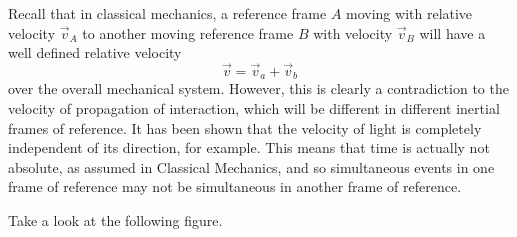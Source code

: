 \documentclass{article}
\begin{document}
			Recall that in classical mechanics, a reference frame $A$ moving with relative velocity $\vec{v}_A$ to another moving reference frame $B$ with velocity $\vec{v}_B$ will have a well defined relative velocity
			$$ \vec{v} = \vec{v}_a + \vec{v}_b$$
			over the overall mechanical system. However, this is clearly a contradiction to the velocity of propagation of interaction, which will be different in different inertial frames of reference. It has been shown that the velocity of light is completely independent of its direction, for example. This means that time is actually not absolute, as assumed in Classical Mechanics, and so simultaneous events in one frame of reference may not be simultaneous in another frame of reference.
			\begin{exmp}
				Take a look at the following figure.
				\begin{figure}[h]
					\begin{subfigure}{0.4\textwidth}
						\center
\end{subfigure}
\end{figure}
\end{exmp}
\end{document}
